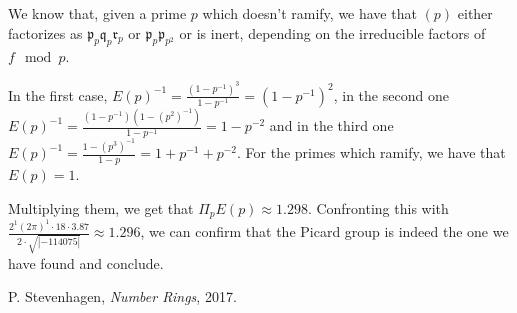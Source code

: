 \documentclass{article}
\newcommand{\pid}{\mathfrak{p}}
\newcommand{\qid}{\mathfrak{q}}
\begin{document}
We know that, given a prime $p$ which doesn't ramify, we have that $(p)$ either factorizes as $\pid_p\qid_p\mathfrak{r}_p$ or $\pid_p\pid_{p^2}$ or is inert, depending on the irreducible factors of $f\mod p$.

In the first case, $E(p)^{-1}=\frac{(1-p^{-1})^3}{1-p^{-1}}=(1-p^{-1})^2$, in the second one $E(p)^{-1}=\frac{(1-p^{-1})(1-(p^2)^{-1})}{1-p^{-1}}=1-p^{-2}$ and in the third one $E(p)^{-1}=\frac{1-(p^3)^{-1}}{1-p}=1+p^{-1}+p^{-2}$. For the primes which ramify, we have that $E(p)=1$.

Multiplying them, we get that $\Pi_{p} E(p)\approx 1.298$. Confronting this with $\frac{2^1(2\pi)^1\cdot 18\cdot 3.87}{2\cdot\sqrt{|-114075|}}\approx 1.296$, we can confirm that the Picard group is indeed the one we have found and conclude.



\begin{thebibliography}{9}
		P. Stevenhagen,
		\textit{Number Rings},
		2017.
\end{thebibliography}
\end{document}
